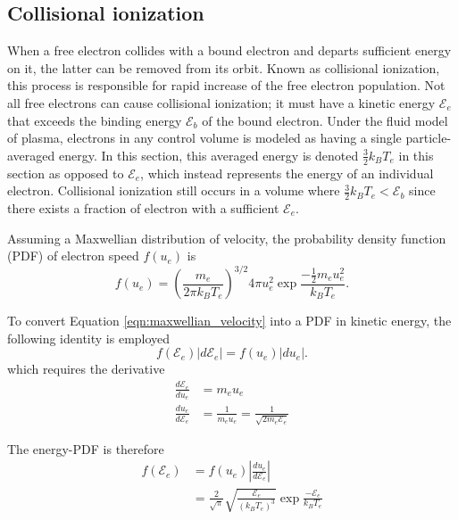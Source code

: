 \subsection{Collisional ionization}
\label{sect:ci}
When a free electron collides with a bound electron and departs sufficient energy on it, the latter can be removed from its orbit. Known as collisional ionization, this process is responsible for rapid increase of
the free electron population. Not all free electrons can cause collisional ionization; it must have a kinetic energy $\mathcal{E}_e$ that exceeds the binding energy $\mathcal{E}_b$ of the bound electron. Under the
fluid model of plasma, electrons in any control volume is modeled as having a single particle-averaged energy. In this section, this averaged energy is denoted $\frac{3}{2} k_B T_e$ in this section as opposed to
$\mathcal{E}_e$, which instead represents the energy of an individual electron. Collisional ionization still occurs in a volume where $\frac{3}{2} k_B T_e < \mathcal{E}_b$ since there exists a fraction of electron
with a sufficient $\mathcal{E}_e$.

Assuming a Maxwellian distribution of velocity, the probability density function (PDF) of electron speed $f(u_e)$ is \cite{Fitzpatrick}
\begin{equation}
    f(u_e) = \left( \frac{m_e}{2\pi k_B T_e} \right)^{3/2} 4\pi u_e^2 \exp{\frac{-\frac{1}{2}m_e u_e^2}{k_B T_e}}.
    \label{eqn:maxwellian_velocity}
\end{equation}

To convert Equation \ref{eqn:maxwellian_velocity} into a PDF in kinetic energy, the following identity is employed
\begin{equation}
    f(\mathcal{E}_e) \left\lvert d\mathcal{E}_e \right\rvert = f(u_e) \left\lvert du_e \right\rvert.
\end{equation}
which requires the derivative
\begin{subequations}
    \begin{align}
        \frac{d\mathcal{E}_e}{du_e} &= m_e u_e \\
        \frac{du_e}{d\mathcal{E}_e} &= \frac{1}{m_e u_e} = \frac{1}{\sqrt{2m_e \mathcal{E}_e}}
    \end{align}
\end{subequations}

The energy-PDF is therefore
\begin{subequations}
    \begin{align}
        f(\mathcal{E}_e) &= f(u_e) \left\lvert \frac{du_e}{d\mathcal{E}_e} \right\rvert \\
        &= \frac{2}{\sqrt{\pi}} \sqrt{\frac{\mathcal{E}_e}{(k_B T_e)^3}} \exp{\frac{-\mathcal{E}_e}{k_B T_e}}
    \end{align}
\end{subequations}


